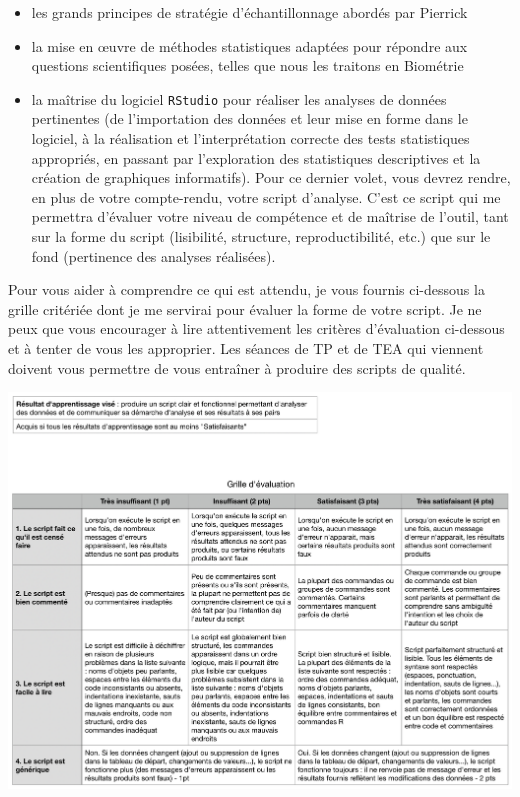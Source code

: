 \documentclass[
  a4paper,
  DIV=11,
  numbers=noendperiod,
  oneside]{scrreprt}
\providecommand{\tightlist}{%
  \setlength{\itemsep}{0pt}\setlength{\parskip}{0pt}}\usepackage{longtable,booktabs,array}
\begin{document}
\begin{itemize}
\tightlist
\item
  les grands principes de stratégie d'échantillonnage abordés par
  Pierrick
\item
  la mise en œuvre de méthodes statistiques adaptées pour répondre aux
  questions scientifiques posées, telles que nous les traitons en
  Biométrie
\item
  la maîtrise du logiciel \texttt{RStudio} pour réaliser les analyses de
  données pertinentes (de l'importation des données et leur mise en
  forme dans le logiciel, à la réalisation et l'interprétation correcte
  des tests statistiques appropriés, en passant par l'exploration des
  statistiques descriptives et la création de graphiques informatifs).
  Pour ce dernier volet, vous devrez rendre, en plus de votre
  compte-rendu, votre script d'analyse. C'est ce script qui me permettra
  d'évaluer votre niveau de compétence et de maîtrise de l'outil, tant
  sur la forme du script (lisibilité, structure, reproductibilité, etc.)
  que sur le fond (pertinence des analyses réalisées).
\end{itemize}

Pour vous aider à comprendre ce qui est attendu, je vous fournis
ci-dessous la grille critériée dont je me servirai pour évaluer la forme
de votre script. Je ne peux que vous encourager à lire attentivement les
critères d'évaluation ci-dessous et à tenter de vous les approprier. Les
séances de TP et de TEA qui viennent doivent vous permettre de vous
entraîner à produire des scripts de qualité.

\includegraphics{./images/Grille.png}
\end{document}
